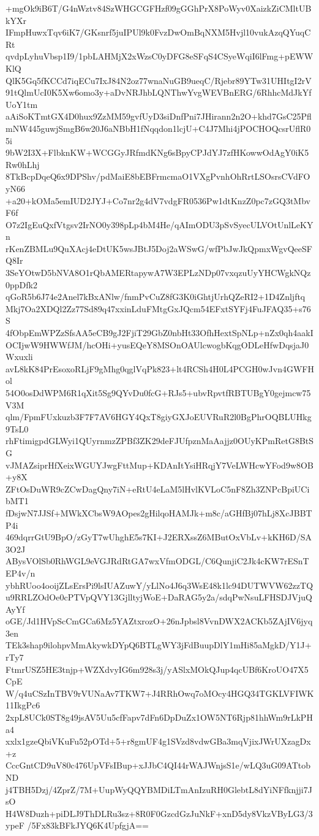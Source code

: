 +mgOk9iB6T/G4nWztv84SzWHGCGFHzf09gGGhPrX8PoWyv0XaizkZiCMltUBkYXr
IFmpHuwxTqv6iK7/GKsnrf5juIPUl9k0FvzDwOmBqNXM5Hvjl10vukAzqQYuqCRt
qvdpLyhuVbsp1I9/1pbLAHMjX2xWzsC0yDFG8eSFqS4CSyeWqiI6lFmg+pEWWKlQ
QlK5Gq5fKCCd7iqECu7IxJ84N2oz77wnaNuGB9ueqC/Rjebr89YTw31UHItgI2rV
91tQlmUcI0K5Xw6omo3y+aDvNRJhbLQNThwYvgWEVBnERG/6RhhcMdJkYfUoY1tm
aAiSoKTmtGX4D0hux9ZzMM59gvfUyD3siDnfPni7JHirann2n2O+khd7GsC25Pfl
mNW445guwjSmgB6w20J6aNBbH1fNqqdon1lcjU+C4J7Mhi4jPOCHOQcsrUflR05i
9bW2I3X+FlbknKW+WCGGyJRfmdKNg6sBpyCPJdYJ7zfHKowwOdAgY0iK5Rw0hLhj
8TkBcpDqeQ6x9DPShv/pdMaiE8bEBFrmcmaO1VXgPvnhOhRrtLSOsrsCVdFOyN66
+a20+kOMa5emIUD2JYJ+Co7nr2g4dV7vdgFR0536Pw1dtKnzZ0pc7zGQ3tMbvF6f
O7z2IgEuQxfVtgsv2IrNO0y398pLp4bM4He/qAImODU3pSvSyecULVOtUnlLeKYn
rKenZBMLu9QuXAcj4eDtUK5wsJBtJ5Doj2aWSwG/wfPbJwJkQpmxWgvQeeSFQ8Ir
3SeYOtwD5bNVA8O1rQbAMERtapywA7W3EPLzNDp07vxqzuUyYHCWgkNQz0ppDfk2
qGoR5b6J74e2Anel7kBxANlw/fnmPvCuZ8fG3K0iGhtjUrhQZeRI2+1D4Znljftq
Mkj7Oa2XDQl2Zz77Sd89q47xxinLduFMtgGxJQcm54EFxtSYFj4FuJFAQ35+s76S
4fObpEmWPZzSfsAA5eCB9gJ2FjiT29GbZ0nbHt33OfhHextSpNLp+nZx0qh4aakI
OCIjwW9HWWfJM/hcOHi+yusEQeY8MSOnOAUlcwogbKqgODLeHfwDqsjaJ0Wxuxli
avL8kK84PrEsoxoRLjF9gMhg0qglVqPk823+lt4RCSh4H0L4PCGH0wJvn4GWFHol
54O0osDdWPM6R1qXit5Sg9QYvDu0fcG+RJs5+ubvRpvtfRBTUBgY0gejmcw75V3M
qlm/FpmFUxkuzb3F7F7AV6HGY4QxT8giyGXJoEUVRuR2l0BgPhrOQBLUHkg9TsL0
rhFtimigpdGLWyi1QUyrnmzZPBf3ZK29deFJUfpznMaAajjz0OUyKPmRetG8BtSG
vJMAZsiprHfXeixWGUYJwgFttMup+KDAnItYsiHRqjY7VeLWHcwYFod9w8OB+y8X
ZFtOsDuWR9cZCwDagQny7iN+eRtU4eLaM5lHvlKVLoC5nF8Zh3ZNPcBpiUCibMT1
fDsjwN7JJSf+MWkXCbsW9AOpes2gHilqoHAMJk+m8c/aGHfBj07hLj8XcJBBTP4i
469dqrrGtU9BpO/zGyT7wUhghE5s7KI+J2ERXssZ6MButOxVbLv+kKH6D/SA3O2J
ABysVOlSb0RhWGL9eVGJRdRtGA7wxVfmODGL/C6QunjiC2Jk4cKW7rESnTEP4v/n
ybhRUoo4ooijZLsErsPi9lsIUAZuwY/yLlNo4J6q3WsE48k1lc94DUTWVW62zzTQ
u9RRLZOdOe0cPTVpQVY13GjlltyjWoE+DaRAG5y2a/sdqPwNsuLFHSDJVjuQAyYf
oGE/Jd1HVpScCmGCa6Mz5YAZtxrozO+26nJpbsl8VvnDWX2ACKb5ZAjIV6jyq3en
TEk3shap9ilohpvMmAkywkDYpQ6BTLgWY3jFdBuupDlY1mHi85aMgkD/Y1J+rTy7
FtmrUSZ5HE3tnjp+WZXdvyIG6m928s3j/yASlxMOkQJup4qcUBf6KroUO47X5CpE
W/q4uCSzInTBV9rVUNaAv7TKW7+J4RRhOwq7oMOcy4HGQ34TGKLVFIWK11IkgPc6
2xpL8UCk0ST8g49jsAV5Uu5cfFapv7dFn6DpDuZx1OW5NT6Rjp81hhWm9rLkPHa4
xxlx1gzeQbiVKuFu52pOTd+5+r8gmUF4g1SVzd8vdwGBa3mqVjixJWrUXzagDx+z
CccGntCD9uV80c476UpVFsIBup+xJJbC4QI44rWAJWnjsS1e/wLQ3uG09ATtobND
j4TBH5Dzj/4ZprZ/7M+UupWyQQYBMDiLTmAnIzuRH0GlebtL8dYiNFfknjji7JsO
H4W8Duzh+piDLJ9ThDLRu3sz+8R0F0GzcdGzJuNkF+xnD5dy8VkzVByLG3/3ypeF
/5Fx83kBFkJYQ6K4UpfgjA==
